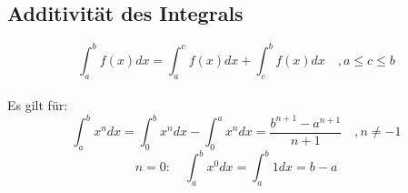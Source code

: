 \subsection{Additivität des Integrals}
\[ \boxed{\int_a^b f(x) dx = \int_a^c f(x) dx + \int_c^b f(x) dx \quad , a 
\leq c \leq b} \]
\\
Es gilt für: 
\[ \boxed{\int_a^b x^n dx = \int_0^b x^n dx - \int_0^a x^n dx 
= \frac{b^{n+1} - a^{n+1}}{n + 1} \quad , n \neq -1} \]
\[ \boxed{n = 0: \quad \int_a^b x^0 dx = \int_a^b 1 dx = b - a} \]
